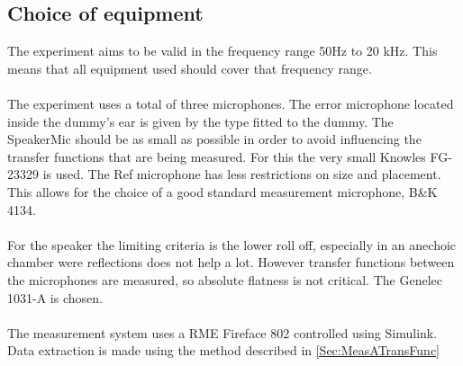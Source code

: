\subsection{Choice of equipment}
The experiment aims to be valid in the frequency range 50Hz to 20 kHz. This means that all equipment used should cover that frequency range. \\\\
The experiment uses a total of three microphones. The error microphone located inside the dummy's ear is given by the type fitted to the dummy. The SpeakerMic should be as small as possible in order to avoid influencing the transfer functions that are being measured. For this the very small Knowles FG-23329 is used. The Ref microphone has less restrictions on size and placement. This allows for the choice of a good standard measurement microphone, B\&K 4134. \\\\
For the speaker the limiting criteria is the lower roll off, especially in an anechoic chamber were reflections does not help a lot. However transfer functions between the microphones are measured, so absolute flatness is not critical. The Genelec 1031-A is chosen. \\\\
The measurement system uses a RME Fireface 802 controlled using Simulink. Data extraction is made using the method described in \autoref{Sec:MeasATransFunc}

